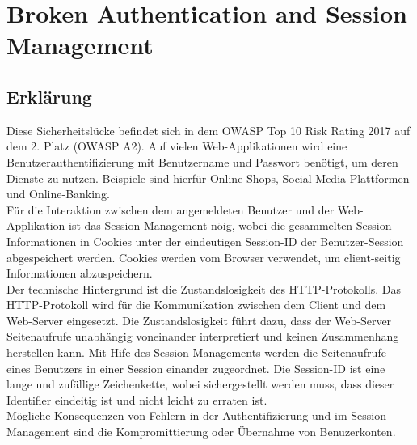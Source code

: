 \chapter{Broken Authentication and Session Management}
\label{BrokenAuthenticationAndSessionManagement}

\section{Erklärung}
Diese Sicherheitslücke befindet sich in dem OWASP Top 10 Risk Rating 2017 auf dem 2. Platz (OWASP A2). 
Auf vielen Web-Applikationen wird eine Benutzerauthentifizierung mit Benutzername und Passwort benötigt, um deren Dienste zu nutzen. Beispiele sind hierfür Online-Shops, Social-Media-Plattformen und Online-Banking. 
\\
Für die Interaktion zwischen dem angemeldeten Benutzer und der Web-Applikation ist das Session-Management nöig, wobei die gesammelten Session-Informationen in Cookies unter der eindeutigen Session-ID der Benutzer-Session abgespeichert werden. Cookies werden vom Browser verwendet, um client-seitig Informationen abzuspeichern.
\\
Der technische Hintergrund ist die Zustandslosigkeit des HTTP-Protokolls. Das HTTP-Protokoll wird für die Kommunikation zwischen dem Client und dem Web-Server eingesetzt. Die Zustandslosigkeit führt dazu, dass der Web-Server Seitenaufrufe unabhängig voneinander interpretiert und keinen Zusammenhang herstellen kann. Mit Hife des Session-Managements werden die Seitenaufrufe eines Benutzers in einer Session einander zugeordnet. Die Session-ID ist eine lange und zufällige Zeichenkette, wobei sichergestellt werden muss, dass dieser Identifier eindeitig ist und nicht leicht zu erraten ist.
\\
Mögliche Konsequenzen von Fehlern in der Authentifizierung und im Session-Management sind die Kompromittierung oder Übernahme von Benuzerkonten.

